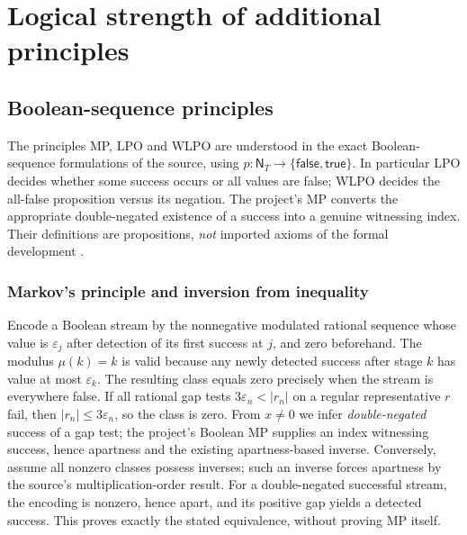\documentclass[11pt,reqno]{amsart}
\theoremstyle{definition}\newtheorem{definition}[theorem]{Definition}
\theoremstyle{remark}\newtheorem{remark}[theorem]{Remark}
\newcommand{\N}{\mathsf N_T}\newcommand{\Z}{\mathsf Z_T}\newcommand{\Q}{\mathsf Q_T}\newcommand{\RR}{\mathsf R}
\newcommand{\eps}{\varepsilon}
\begin{document}
\clearpage
\section{Logical strength of additional principles}\label{sec:logic}
\subsection{Boolean-sequence principles}\label{main:sub-53}
The principles MP, LPO and WLPO are understood in the exact Boolean-sequence formulations of the source, using $p:\N\to\{\mathsf{false},\mathsf{true}\}$. In particular LPO decides whether some success occurs or all values are false; WLPO decides the all-false proposition versus its negation. The project's MP converts the appropriate double-negated existence of a success into a genuine witnessing index. Their definitions are propositions, \emph{not} imported axioms of the formal development \cite{bridgesrichman,lubarsky}.


\medskip
\subsubsection*{Markov's principle and inversion from inequality}\label{supp:14-1}
Encode a Boolean stream by the nonnegative modulated rational sequence whose value is $\eps_j$ after detection of its first success at $j$, and zero beforehand. The modulus $\mu(k)=k$ is valid because any newly detected success after stage $k$ has value at most $\eps_k$. The resulting class equals zero precisely when the stream is everywhere false. If all rational gap tests $3\eps_n<|r_n|$ on a regular representative $r$ fail, then $|r_n|\le3\eps_n$, so the class is zero. From $x\ne0$ we infer \emph{double-negated} success of a gap test; the project's Boolean MP supplies an index witnessing success, hence apartness and the existing apartness-based inverse. Conversely, assume all nonzero classes possess inverses; such an inverse forces apartness by the source's multiplication-order result. For a double-negated successful stream, the encoding is nonzero, hence apart, and its positive gap yields a detected success. This proves exactly the stated equivalence, without proving MP itself.
\medskip
\end{document}
